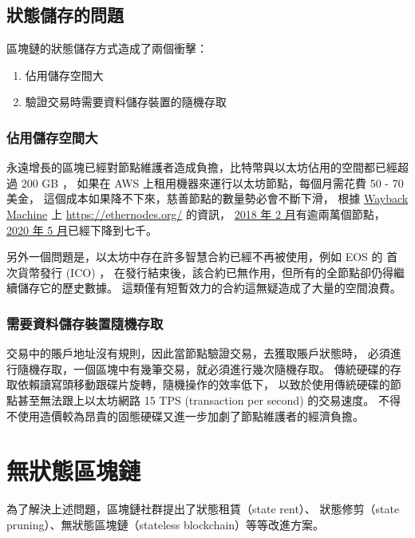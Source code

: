 \subsection{狀態儲存的問題}

區塊鏈的狀態儲存方式造成了兩個衝擊：

\begin{enumerate}
  \item 佔用儲存空間大
  \item 驗證交易時需要資料儲存裝置的隨機存取
\end{enumerate}

\subsubsection{佔用儲存空間大}

永遠增長的區塊已經對節點維護者造成負擔，比特幣與以太坊佔用的空間都已經超過 200 GB ，
如果在 AWS 上租用機器來運行以太坊節點，每個月需花費 50 - 70 美金，
這個成本如果降不下來，慈善節點的數量勢必會不斷下滑，
根據 \href{https://web.archive.org}{Wayback Machine} 上 \url{https://ethernodes.org/} 的資訊，
\href{https://web.archive.org/web/20180224224831/https://www.ethernodes.org/network/1}{2018 年 2 月}有逾兩萬個節點，
\href{https://web.archive.org/web/20200512075927/https://www.ethernodes.org/}{2020 年 5 月}已經下降到七千。

另外一個問題是，以太坊中存在許多智慧合約已經不再被使用，例如 EOS 的 首次貨幣發行 (ICO) ，
在發行結束後，該合約已無作用，但所有的全節點卻仍得繼續儲存它的歷史數據。
這類僅有短暫效力的合約這無疑造成了大量的空間浪費。

\subsubsection{需要資料儲存裝置隨機存取}
交易中的賬戶地址沒有規則，因此當節點驗證交易，去獲取賬戶狀態時，
必須進行隨機存取，一個區塊中有幾筆交易，就必須進行幾次隨機存取。
傳統硬碟的存取依賴讀寫頭移動跟碟片旋轉，隨機操作的效率低下，
以致於使用傳統硬碟的節點甚至無法跟上以太坊網路 15 TPS (transaction per second) 的交易速度。
不得不使用造價較為昂貴的固態硬碟又進一步加劇了節點維護者的經濟負擔。

\section{無狀態區塊鏈}
為了解決上述問題，區塊鏈社群提出了狀態租賃（state rent）、
狀態修剪（state pruning）、無狀態區塊鏈（stateless blockchain）等等改進方案。

